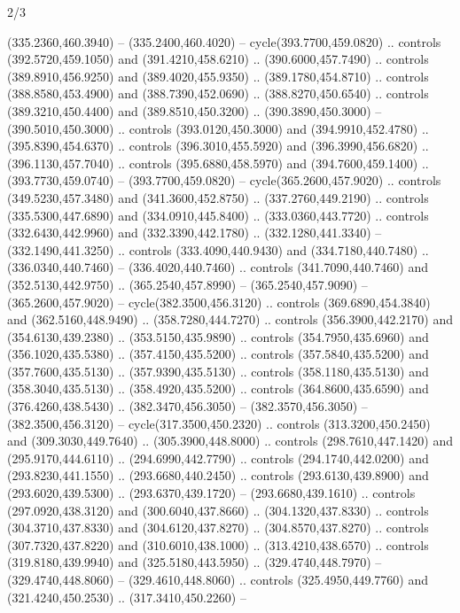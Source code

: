 \begin{flagdescription}{2/3}
\begin{scope}[xshift=0.5\flaglength]
\begin{scope}[scale=0.00209\flagwidth,yshift=170mm,xshift=-360]
\begin{scope}[y=-0.8pt, x=0.8pt, inner sep=0pt, outer sep=0pt]
  (335.2360,460.3940) -- (335.2400,460.4020) -- cycle(393.7700,459.0820) ..
  controls (392.5720,459.1050) and (391.4210,458.6210) .. (390.6000,457.7490) ..
  controls (389.8910,456.9250) and (389.4020,455.9350) .. (389.1780,454.8710) ..
  controls (388.8580,453.4900) and (388.7390,452.0690) .. (388.8270,450.6540) ..
  controls (389.3210,450.4400) and (389.8510,450.3200) .. (390.3890,450.3000) --
  (390.5010,450.3000) .. controls (393.0120,450.3000) and (394.9910,452.4780) ..
  (395.8390,454.6370) .. controls (396.3010,455.5920) and (396.3990,456.6820) ..
  (396.1130,457.7040) .. controls (395.6880,458.5970) and (394.7600,459.1400) ..
  (393.7730,459.0740) -- (393.7700,459.0820) -- cycle(365.2600,457.9020) ..
  controls (349.5230,457.3480) and (341.3600,452.8750) .. (337.2760,449.2190) ..
  controls (335.5300,447.6890) and (334.0910,445.8400) .. (333.0360,443.7720) ..
  controls (332.6430,442.9960) and (332.3390,442.1780) .. (332.1280,441.3340) --
  (332.1490,441.3250) .. controls (333.4090,440.9430) and (334.7180,440.7480) ..
  (336.0340,440.7460) -- (336.4020,440.7460) .. controls (341.7090,440.7460) and
  (352.5130,442.9750) .. (365.2540,457.8990) -- (365.2540,457.9090) --
  (365.2600,457.9020) -- cycle(382.3500,456.3120) .. controls
  (369.6890,454.3840) and (362.5160,448.9490) .. (358.7280,444.7270) .. controls
  (356.3900,442.2170) and (354.6130,439.2380) .. (353.5150,435.9890) .. controls
  (354.7950,435.6960) and (356.1020,435.5380) .. (357.4150,435.5200) .. controls
  (357.5840,435.5200) and (357.7600,435.5130) .. (357.9390,435.5130) .. controls
  (358.1180,435.5130) and (358.3040,435.5130) .. (358.4920,435.5200) .. controls
  (364.8600,435.6590) and (376.4260,438.5430) .. (382.3470,456.3050) --
  (382.3570,456.3050) -- (382.3500,456.3120) -- cycle(317.3500,450.2320) ..
  controls (313.3200,450.2450) and (309.3030,449.7640) .. (305.3900,448.8000) ..
  controls (298.7610,447.1420) and (295.9170,444.6110) .. (294.6990,442.7790) ..
  controls (294.1740,442.0200) and (293.8230,441.1550) .. (293.6680,440.2450) ..
  controls (293.6130,439.8900) and (293.6020,439.5300) .. (293.6370,439.1720) --
  (293.6680,439.1610) .. controls (297.0920,438.3120) and (300.6040,437.8660) ..
  (304.1320,437.8330) .. controls (304.3710,437.8330) and (304.6120,437.8270) ..
  (304.8570,437.8270) .. controls (307.7320,437.8220) and (310.6010,438.1000) ..
  (313.4210,438.6570) .. controls (319.8180,439.9940) and (325.5180,443.5950) ..
  (329.4740,448.7970) -- (329.4740,448.8060) -- (329.4610,448.8060) .. controls
  (325.4950,449.7760) and (321.4240,450.2530) .. (317.3410,450.2260) --

\end{scope}
\end{scope}
\end{scope}
\end{flagdescription}
